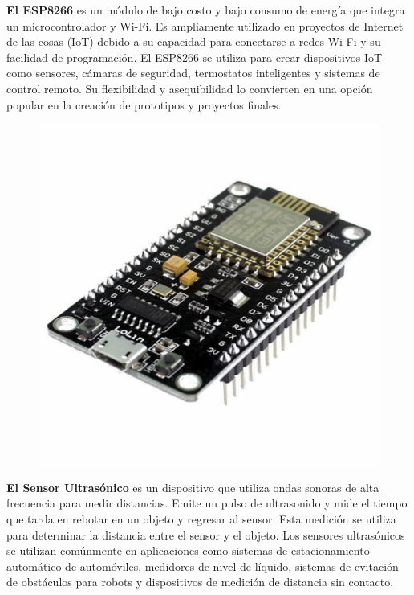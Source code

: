 \documentclass[osajnl,twocolumn,showpacs,superscriptaddress,10pt]{revtex4-1}
\begin{document}
\textbf{El ESP8266} es un módulo de bajo costo y bajo consumo de energía que integra un microcontrolador y Wi-Fi. Es ampliamente utilizado en proyectos de Internet de las cosas (IoT) debido a su capacidad para conectarse a redes Wi-Fi y su facilidad de programación. El ESP8266 se utiliza para crear dispositivos IoT como sensores, cámaras de seguridad, termostatos inteligentes y sistemas de control remoto. Su flexibilidad y asequibilidad lo convierten en una opción popular en la creación de prototipos y proyectos finales.

\begin{figure}[H]
\begin{center}
    \includegraphics[scale=0.15]{images/MODULO-WI-FI-NODEMCU-ESP8266-1200x1200.jpg}
    \end{center}
\end{figure}

\textbf{El Sensor Ultrasónico} es un dispositivo que utiliza ondas sonoras de alta frecuencia para medir distancias. Emite un pulso de ultrasonido y mide el tiempo que tarda en rebotar en un objeto y regresar al sensor. Esta medición se utiliza para determinar la distancia entre el sensor y el objeto. Los sensores ultrasónicos se utilizan comúnmente en aplicaciones como sistemas de estacionamiento automático de automóviles, medidores de nivel de líquido, sistemas de evitación de obstáculos para robots y dispositivos de medición de distancia sin contacto.
\end{document}

